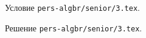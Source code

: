 \problem
Условие \texttt{pers-algbr/senior/3.tex}.

\solution Решение \texttt{pers-algbr/senior/3.tex}.
\endproblem
